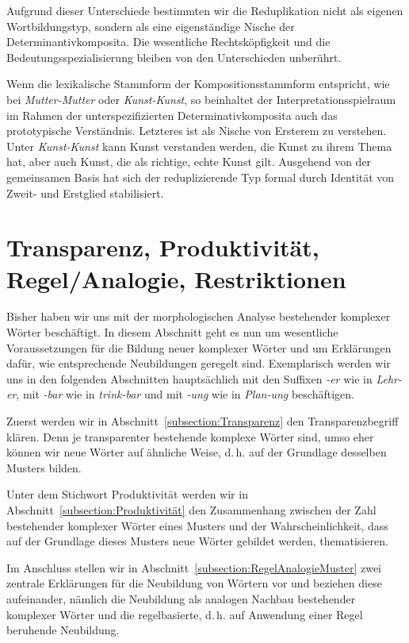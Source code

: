 Aufgrund dieser Unterschiede bestimmten wir die Reduplikation nicht als eigenen Wortbildungstyp, sondern als eine eigenständige Nische der Determinantivkomposita. Die wesentliche Rechtsköpfigkeit und die Bedeutungsspezialisierung bleiben von den Unterschieden unberührt.

Wenn die lexikalische Stammform der Kompositionsstammform entspricht, wie bei \textit{Mutter-Mutter} oder \textit{Kunst-Kunst}, so beinhaltet der Interpretationsspielraum im Rahmen der unterspezifizierten Determinativkomposita auch das prototypische Verständnis. Letzteres ist als Nische von Ersterem zu verstehen. Unter \textit{Kunst-Kunst} kann Kunst verstanden werden, die \zB Kunst zu ihrem Thema hat, aber auch Kunst, die als richtige, echte Kunst gilt. Ausgehend von der gemeinsamen Basis hat sich der reduplizierende Typ formal durch Identität von Zweit- und Erstglied stabilisiert.   


\section{Transparenz, Produktivität, Regel/Analogie, Restriktionen}\label{section:Produktivität}

Bisher haben wir uns mit der morphologischen Analyse bestehender komplexer Wörter beschäftigt. In diesem Abschnitt geht es nun um wesentliche Voraussetzungen für die Bildung neuer komplexer Wörter und um Erklärungen dafür, wie entsprechende Neubildungen geregelt sind. Exemplarisch werden wir uns in den folgenden Abschnitten hauptsächlich mit den Suffixen \textit{-er} wie in \textit{Lehr-er}, mit \textit{-bar} wie in \textit{trink-bar} und mit \textit{-ung} wie in \textit{Plan-ung} beschäftigen. 

Zuerst werden wir in Abschnitt~\ref{subsection:Transparenz} den Transparenzbegriff klären. Denn je transparenter bestehende komplexe Wörter sind, umso eher können wir neue Wörter auf ähnliche Weise, d.\,h. auf der Grundlage desselben Musters bilden. 

Unter dem Stichwort Produktivität werden wir in Abschnitt~\ref{subsection:Produktivität} den Zusammenhang zwischen der Zahl bestehender komplexer Wörter eines Musters und der Wahrscheinlichkeit, dass auf der Grundlage dieses Musters neue Wörter gebildet werden, thematisieren. 

Im Anschluss stellen wir in Abschnitt~\ref{subsection:RegelAnalogieMuster} zwei zentrale Erklärungen für die Neubildung von Wörtern vor und beziehen diese aufeinander, nämlich die Neubildung als analogen Nachbau bestehender komplexer Wörter und die regelbasierte, d.\,h. auf Anwendung einer Regel beruhende Neubildung. 

